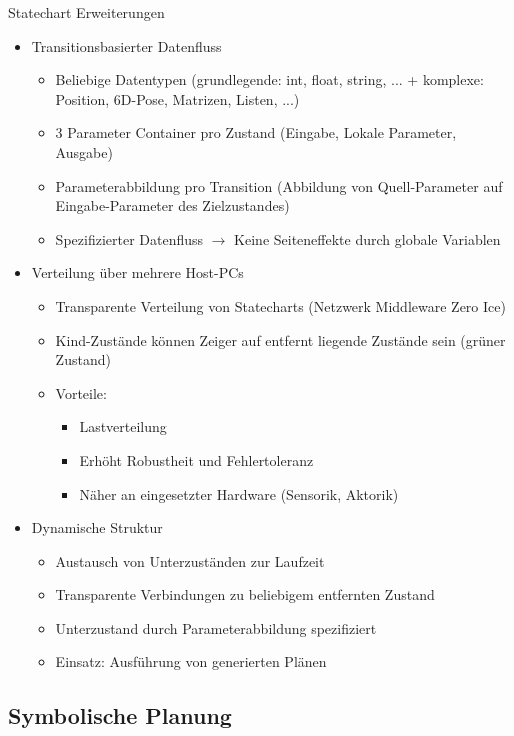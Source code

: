 \documentclass[paper=a4, fontsize=11pt]{scrartcl} %
\numberwithin{equation}{section} %
\numberwithin{figure}{section} %
\numberwithin{table}{section} %
\begin{document}
Statechart Erweiterungen
\begin{itemize}
\item Transitionsbasierter Datenfluss
\begin{itemize}
\item Beliebige Datentypen (grundlegende: int, float, string, ... + komplexe: Position, 6D-Pose, Matrizen, Listen, ...)
\item 3 Parameter Container pro Zustand (Eingabe, Lokale Parameter, Ausgabe)
\item Parameterabbildung pro Transition (Abbildung von Quell-Parameter auf Eingabe-Parameter des Zielzustandes)
\item Spezifizierter Datenfluss $\rightarrow$ Keine Seiteneffekte durch globale Variablen
\end{itemize}
\item Verteilung über mehrere Host-PCs
\begin{itemize}
\item Transparente Verteilung von Statecharts (Netzwerk Middleware Zero Ice)
\item Kind-Zustände können Zeiger auf entfernt liegende Zustände sein (grüner Zustand)
\item Vorteile:
\begin{itemize}
\item Lastverteilung
\item Erhöht Robustheit und Fehlertoleranz
\item Näher an eingesetzter Hardware (Sensorik, Aktorik)
\end{itemize}
\end{itemize}
\item Dynamische Struktur
\begin{itemize}
\item Austausch von Unterzuständen zur Laufzeit
\item Transparente Verbindungen zu beliebigem entfernten Zustand
\item Unterzustand durch Parameterabbildung spezifiziert
\item Einsatz: Ausführung von generierten Plänen
\end{itemize}
\end{itemize}

\subsection{Symbolische Planung}
\end{document}
